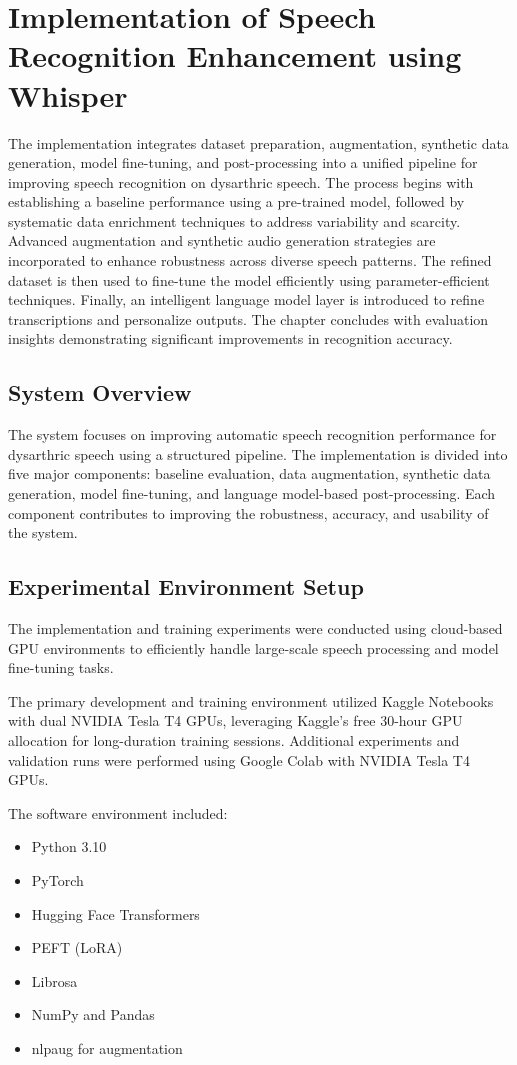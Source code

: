 \chapter{Implementation of Speech Recognition Enhancement using Whisper}

The implementation integrates dataset preparation, augmentation, synthetic data generation, model fine-tuning, and post-processing into a unified pipeline for improving speech recognition on dysarthric speech. The process begins with establishing a baseline performance using a pre-trained model, followed by systematic data enrichment techniques to address variability and scarcity. Advanced augmentation and synthetic audio generation strategies are incorporated to enhance robustness across diverse speech patterns. The refined dataset is then used to fine-tune the model efficiently using parameter-efficient techniques. Finally, an intelligent language model layer is introduced to refine transcriptions and personalize outputs. The chapter concludes with evaluation insights demonstrating significant improvements in recognition accuracy.

\section{System Overview}
The system focuses on improving automatic speech recognition performance for dysarthric speech using a structured pipeline. The implementation is divided into five major components: baseline evaluation, data augmentation, synthetic data generation, model fine-tuning, and language model-based post-processing. Each component contributes to improving the robustness, accuracy, and usability of the system.

\section{Experimental Environment Setup}

The implementation and training experiments were conducted using cloud-based GPU environments to efficiently handle large-scale speech processing and model fine-tuning tasks.

The primary development and training environment utilized Kaggle Notebooks with dual NVIDIA Tesla T4 GPUs, leveraging Kaggle’s free 30-hour GPU allocation for long-duration training sessions. Additional experiments and validation runs were performed using Google Colab with NVIDIA Tesla T4 GPUs.

The software environment included:
\begin{itemize}
\item Python 3.10
\item PyTorch
\item Hugging Face Transformers
\item PEFT (LoRA)
\item Librosa
\item NumPy and Pandas
\item nlpaug for augmentation
\end{itemize}

